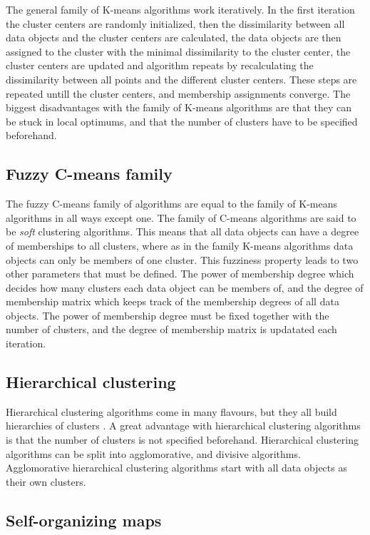 The general family of K-means algorithms work iteratively. In the first iteration the cluster centers are randomly initialized, 
then the dissimilarity between all data objects and the cluster centers are calculated, 
the data objects are then assigned to the cluster with the minimal dissimilarity to the cluster center,
the cluster centers are updated and algorithm repeats by recalculating the dissimilarity between all points and the different cluster centers.
These steps are repeated untill the cluster centers, and membership assignments converge.
The biggest disadvantages with the family of K-means algorithms are that they can be stuck in local optimums, 
and that the number of clusters have to be specified beforehand.

\subsection{Fuzzy C-means family}
The fuzzy C-means family of algorithms are equal to the family of K-means algorithms in all ways except one. 
The family of C-means algorithms are said to be \textit{soft} clustering algorithms. 
This means that all data objects can have a degree of memberships to all clusters, where as in the family K-means algorithms data objects can only be members of one cluster.
This fuzziness property leads to two other parameters that must be defined.
The power of membership degree which decides how many clusters each data object can be members of, 
and the degree of membership matrix which keeps track of the membership degrees of all data objects.
The power of membership degree must be fixed together with the number of clusters, and the degree of membership matrix is updatated each iteration.

\subsection{Hierarchical clustering}
Hierarchical clustering algorithms come in many flavours, but they all build hierarchies of clusters \cite{espen}.
A great advantage with hierarchical clustering algorithms is that the number of clusters is not specified beforehand. 
Hierarchical clustering algorithms can be split into agglomorative, and divisive algorithms.
Agglomorative hierarchical clustering algorithms start with all data objects as their own clusters. 

\subsection{Self-organizing maps}

